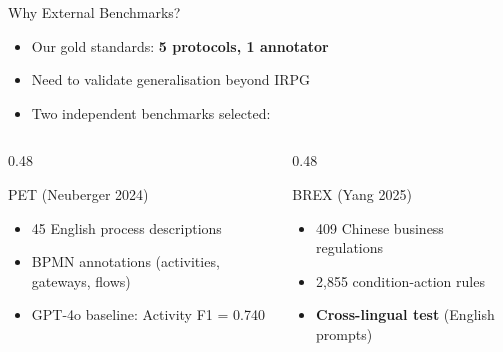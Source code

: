 \documentclass[aspectratio=169, 12pt]{beamer}
\begin{document}
\begin{frame}{Why External Benchmarks?}
\begin{itemize}
    \item Our gold standards: \textbf{5 protocols, 1 annotator}
    \item Need to validate generalisation beyond IRPG
    \item Two independent benchmarks selected:
\end{itemize}

\vspace{0.4cm}
\begin{columns}
\begin{column}{0.48\textwidth}
\begin{block}{PET (Neuberger 2024)}
\small
\begin{itemize}
    \item 45 English process descriptions
    \item BPMN annotations (activities, gateways, flows)
    \item GPT-4o baseline: Activity F1 = 0.740
\end{itemize}
\end{block}
\end{column}
\begin{column}{0.48\textwidth}
\begin{block}{BREX (Yang 2025)}
\small
\begin{itemize}
    \item 409 Chinese business regulations
    \item 2,855 condition-action rules
    \item \textbf{Cross-lingual test} (English prompts)
\end{itemize}
\end{block}
\end{column}
\end{columns}
\end{frame}
\end{document}
